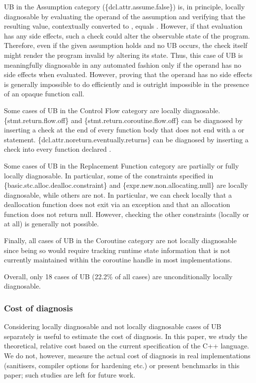 UB in the Assumption category (\{dcl.attr.assume.false\}) is, in principle, locally diagnosable by evaluating the operand of the assumption and verifying that the resulting value, contextually converted to , equals . However, if that evaluation has any side effects, such a check could alter the observable state of the program. Therefore, even if the given assumption holds and no UB occurs, the check itself might render the program invalid by altering its state. Thus, this case of UB is  meaningfully diagnosable in any automated fashion only if the operand has no side effects when evaluated. However, proving that the operand has no side effects is generally impossible to do efficiently and is outright impossible in the presence of an opaque function call.

Some cases of UB in the Control Flow category are locally diagnosable. \{stmt.return.flow.off\} and \{stmt.return.coroutine.flow.off\} can be diagnosed by inserting a check at the end of every function body that does not end with a  or  statement. \{dcl.attr.noreturn.eventually.returns\} can be diagnosed by inserting a check into every function declared \tcode{[[noreturn]]}.

Some cases of UB in the Replacement Function category are partially or fully locally diagnosable. In particular, some of the constraints specified in \{basic.stc.alloc.dealloc.constraint\} and \{expr.new.non.allocating.null\} are locally diagnosable, while others are not. In particular, we can check locally that a deallocation function does not exit via an exception and that an allocation function does not return null. However, checking the other constraints (locally or at all) is generally not possible.

Finally, all cases of UB in the Coroutine category are not locally diagnosable since being so would require tracking runtime state information that is not currently maintained within the coroutine handle in most implementations.

Overall, only 18 cases of UB (22.2\% of all cases) are unconditionally locally diagnosable.

\subsubsection{Cost of diagnosis}
\label{cost}

Considering locally diagnosable and not locally diagnosable cases of UB separately is useful to estimate the cost of diagnosis. In this paper, we study the theoretical, relative cost based on the current specification of the C++ language. We do not, however, measure the actual cost of diagnosis in real implementations (sanitisers, compiler options for hardening etc.) or present benchmarks in this paper; such studies are left for future work.

